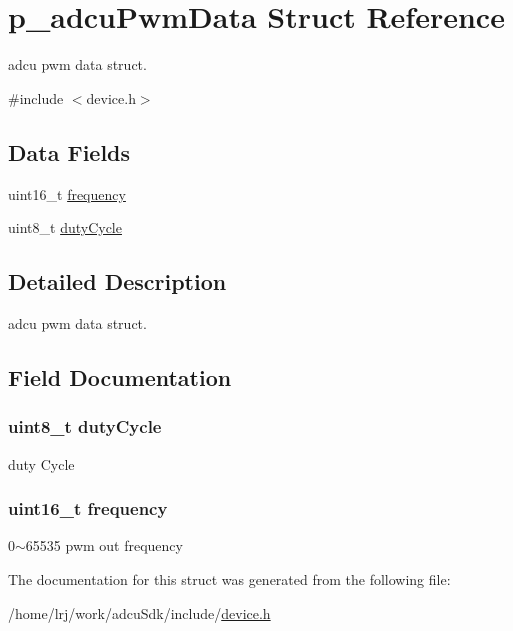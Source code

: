 \hypertarget{structp__adcuPwmData}{}\section{p\+\_\+adcu\+Pwm\+Data Struct Reference}
\label{structp__adcuPwmData}


adcu pwm data struct.  




{\ttfamily \#include $<$device.\+h$>$}

\subsection*{Data Fields}
\begin{DoxyCompactItemize}
\item 
uint16\+\_\+t \hyperlink{structp__adcuPwmData_aea762e0e67fcafaf5b3cd61201769926}{frequency}
\item 
uint8\+\_\+t \hyperlink{structp__adcuPwmData_a1b27f9b6825bec58e8310f45482ab7da}{duty\+Cycle}
\end{DoxyCompactItemize}


\subsection{Detailed Description}
adcu pwm data struct. 

\subsection{Field Documentation}
\subsubsection[{\texorpdfstring{duty\+Cycle}{dutyCycle}}]{\setlength{\rightskip}{0pt plus 5cm}uint8\+\_\+t duty\+Cycle}\hypertarget{structp__adcuPwmData_a1b27f9b6825bec58e8310f45482ab7da}{}\label{structp__adcuPwmData_a1b27f9b6825bec58e8310f45482ab7da}
duty Cycle 
\subsubsection[{\texorpdfstring{frequency}{frequency}}]{\setlength{\rightskip}{0pt plus 5cm}uint16\+\_\+t frequency}\hypertarget{structp__adcuPwmData_aea762e0e67fcafaf5b3cd61201769926}{}\label{structp__adcuPwmData_aea762e0e67fcafaf5b3cd61201769926}
0$\sim$65535 pwm out frequency 

The documentation for this struct was generated from the following file\+:\begin{DoxyCompactItemize}
\item 
/home/lrj/work/adcu\+Sdk/include/\hyperlink{device_8h}{device.\+h}\end{DoxyCompactItemize}
